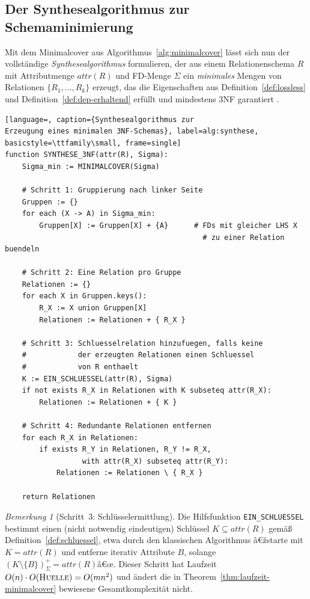 ﻿\documentclass[a4paper,12pt]{report}
\theoremstyle{definition}
\theoremstyle{remark}
\newtheorem{remark}{Bemerkung}[chapter]
\newcommand{\att}{\mathit{attr}}
\begin{document}
\subsection{Der Synthesealgorithmus zur Schemaminimierung}

Mit dem Minimalcover aus Algorithmus~\ref{alg:minimalcover} lässt sich
nun der vollständige \emph{Synthesealgorithmus} formulieren, der aus
einem Relationenschema $R$ mit Attributmenge $\att(R)$ und FD-Menge
$\Sigma$ ein \emph{minimales} Mengen von Relationen $\{R_1,\ldots,R_k\}$
erzeugt, das die Eigenschaften aus Definition~\ref{def:lossless} und
Definition~\ref{def:dep-erhaltend} erfüllt und mindestens 3NF
garantiert \cite{Ullman1988,Date2003}.

\begin{lstlisting}[language=, caption={Synthesealgorithmus zur
Erzeugung eines minimalen 3NF-Schemas}, label=alg:synthese,
basicstyle=\ttfamily\small, frame=single]
function SYNTHESE_3NF(attr(R), Sigma):
    Sigma_min := MINIMALCOVER(Sigma)

    # Schritt 1: Gruppierung nach linker Seite
    Gruppen := {}
    for each (X -> A) in Sigma_min:
        Gruppen[X] := Gruppen[X] + {A}      # FDs mit gleicher LHS X
                                              # zu einer Relation buendeln

    # Schritt 2: Eine Relation pro Gruppe
    Relationen := {}
    for each X in Gruppen.keys():
        R_X := X union Gruppen[X]
        Relationen := Relationen + { R_X }

    # Schritt 3: Schluesselrelation hinzufuegen, falls keine
    #            der erzeugten Relationen einen Schluessel
    #            von R enthaelt
    K := EIN_SCHLUESSEL(attr(R), Sigma)
    if not exists R_X in Relationen with K subseteq attr(R_X):
        Relationen := Relationen + { K }

    # Schritt 4: Redundante Relationen entfernen
    for each R_X in Relationen:
        if exists R_Y in Relationen, R_Y != R_X,
                  with attr(R_X) subseteq attr(R_Y):
            Relationen := Relationen \ { R_X }

    return Relationen
\end{lstlisting}

\begin{remark}[Schritt~3: Schlüsselermittlung]
Die Hilfsfunktion \texttt{EIN\_SCHLUESSEL} bestimmt einen
(nicht notwendig eindeutigen) Schlüssel $K\subseteq\att(R)$ gemäß
Definition~\ref{def:schluessel}, etwa durch den klassischen Algorithmus
â€žstarte mit $K=\att(R)$ und entferne iterativ Attribute $B$, solange
$(K\setminus\{B\})^+_\Sigma=\att(R)$â€œ. Dieser Schritt hat
Laufzeit $O(n)\cdot O(\textsc{Huelle})=O(mn^2)$ und ändert die in
Theorem~\ref{thm:laufzeit-minimalcover} bewiesene Gesamtkomplexität
nicht.
\end{remark}
\end{document}
